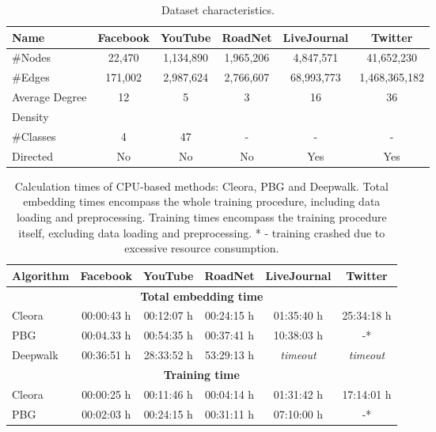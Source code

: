 \documentclass{IEEEtran}
\begin{document}
 \begin{table*}
\small
\centering
\begin{tabular}{ l|c|c|c|c|c } 
 \hline

 Name & \textbf{Facebook} & \textbf{YouTube} & \textbf{RoadNet} & \textbf{LiveJournal} & \textbf{Twitter} \\\hline
 \#Nodes & 22,470 & 1,134,890 & 1,965,206 & 4,847,571 & 41,652,230 \\ 
 \#Edges & 171,002 & 2,987,624 & 2,766,607 & 68,993,773 & 1,468,365,182 \\ 
 Average Degree & 12 & 5 & 3 & 16 & 36 \\
 Density &  &  &  &  & \\
 \#Classes & 4 & 47 & - & - & - \\
 Directed & No & No & No & Yes & Yes \\
 \hline
\end{tabular}
\caption{Dataset characteristics.}
\label{datasets}
\end{table*}

\begin{table*}
\small
\centering
\begin{tabular}{ l|c|c|c|c|c } 
 \hline
 Algorithm & \textbf{Facebook} & \textbf{YouTube} & \textbf{RoadNet} & \textbf{LiveJournal} & \textbf{Twitter} \\\hline
  \multicolumn{6}{c}{\textbf{Total embedding time}} \\\hline
 Cleora & 00:00:43 h & 00:12:07 h & 00:24:15 h & 01:35:40 h  & 25:34:18 h \\ 
 PBG & 00:04.33 h & 00:54:35 h & 00:37:41 h &  10:38:03 h & -* \\
 Deepwalk & 00:36:51 h & 28:33:52 h & 53:29:13 h & \textit{timeout} & \textit{timeout} \\ 
\hline
 \multicolumn{6}{c}{\textbf{Training time}} \\ \hline
 Cleora & 00:00:25 h & 00:11:46 h & 00:04:14 h & 01:31:42 h & 17:14:01 h \\ 
 PBG & 00:02:03 h & 00:24:15 h & 00:31:11 h & 07:10:00 h & -* \\
 \hline
\end{tabular}
\caption{Calculation times of CPU-based methods: Cleora, PBG and Deepwalk. Total embedding times encompass the whole training procedure, including data loading and preprocessing. Training times encompass the training procedure itself, excluding data loading and preprocessing. * - training crashed due to excessive resource consumption.}
\label{training-time}
\end{table*}
 
\end{document}

